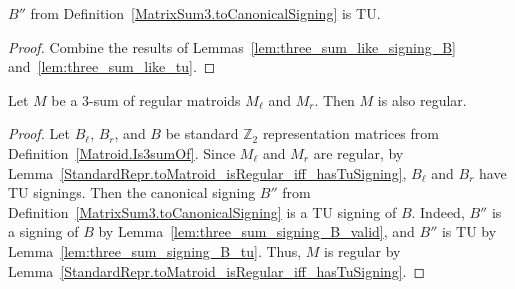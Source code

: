 \begin{lemma}
    \label{lem:three_sum_signing_B_tu}
    \leanok
    $B''$ from Definition~\ref{MatrixSum3.toCanonicalSigning} is TU.
\end{lemma}

\begin{proof}
    Combine the results of Lemmas~\ref{lem:three_sum_like_signing_B} and~\ref{lem:three_sum_like_tu}.
\end{proof}

\begin{theorem}
    \label{Matroid.Is3sumOf.isRegular}
    \leanok
    Let $M$ be a $3$-sum of regular matroids $M_{\ell}$ and $M_{r}$. Then $M$ is also regular.
\end{theorem}

\begin{proof}
    \leanok
    Let $B_{\ell}$, $B_{r}$, and $B$ be standard $\mathbb{Z}_{2}$ representation matrices from Definition~\ref{Matroid.Is3sumOf}. Since $M_{\ell}$ and $M_{r}$ are regular, by Lemma~\ref{StandardRepr.toMatroid_isRegular_iff_hasTuSigning}, $B_{\ell}$ and $B_{r}$ have TU signings. Then the canonical signing $B''$ from Definition~\ref{MatrixSum3.toCanonicalSigning} is a TU signing of $B$. Indeed, $B''$ is a signing of $B$ by Lemma~\ref{lem:three_sum_signing_B_valid}, and $B''$ is TU by Lemma~\ref{lem:three_sum_signing_B_tu}. Thus, $M$ is regular by Lemma~\ref{StandardRepr.toMatroid_isRegular_iff_hasTuSigning}.
\end{proof}
